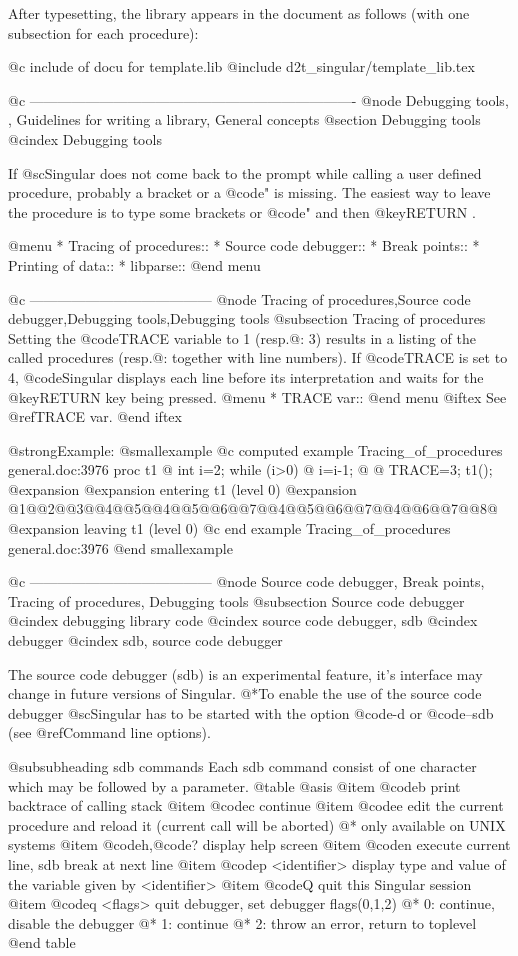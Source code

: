{{{After typesetting, the library appears in the document as follows (with
one subsection for each procedure):

@c include of docu for template.lib
@include d2t_singular/template_lib.tex

@c ----------------------------------------------------------------------
@node Debugging tools,  , Guidelines for writing a library, General concepts
@section Debugging tools
@cindex Debugging tools

If @sc{Singular} does not come back to the prompt while calling a user
defined procedure, probably a bracket or a @code{"} is missing.  The
easiest way to leave the procedure is to type some brackets or @code{"}
and then @key{RETURN} .

@menu
* Tracing of procedures::
* Source code debugger::
* Break points::
* Printing of data::
* libparse::
@end menu

@c ---------------------------------------
@node Tracing of procedures,Source code debugger,Debugging tools,Debugging tools
@subsection Tracing of procedures
Setting the @code{TRACE} variable to 1 (resp.@: 3) results in a listing of
the called procedures (resp.@: together with line numbers).
If @code{TRACE} is set to 4, @code{Singular}
displays each line before its interpretation and waits for the @key{RETURN}
key being pressed.
@menu
* TRACE var::
@end menu
@iftex
See @ref{TRACE var}.
@end iftex

@strong{Example:}
@smallexample
@c computed example Tracing_of_procedures general.doc:3976 
  proc t1
  @{
    int i=2;
    while (i>0)
    @{ i=i-1; @}
  @}
  TRACE=3;
  t1();
@expansion{} 
@expansion{} entering t1 (level 0)
@expansion{} @{1@}@{2@}@{3@}@{4@}@{5@}@{4@}@{5@}@{6@}@{7@}@{4@}@{5@}@{6@}@{7@}@{4@}@{6@}@{7@}@{8@}
@expansion{} leaving  t1 (level 0)
@c end example Tracing_of_procedures general.doc:3976
@end smallexample

@c ---------------------------------------
@node Source code debugger, Break points, Tracing of procedures, Debugging tools
@subsection Source code debugger
@cindex debugging library code
@cindex source code debugger, sdb
@cindex debugger
@cindex sdb, source code debugger


The source code debugger (sdb) is an experimental feature, it's
interface may change in future versions of Singular.  @*To enable the
use of the source code debugger @sc{Singular} has to be started with the
option @code{-d} or @code{--sdb} (see @ref{Command line options}).


@subsubheading sdb commands
Each sdb command consist of one character which may be followed by
a parameter.
@table @asis
@item @code{b}
print backtrace of calling stack
@item @code{c}
continue
@item @code{e}
edit the current procedure and reload it (current call will be aborted)
@* only available on UNIX systems
@item @code{h},@code{?}
display help screen
@item @code{n}
execute current line, sdb break at next line
@item @code{p} <identifier>
display type and value of the variable given by <identifier>
@item @code{Q}
quit this Singular session
@item @code{q} <flags>
quit debugger, set debugger flags(0,1,2)
@* 0: continue, disable the debugger
@* 1: continue
@* 2: throw an error, return to toplevel
@end table


}}}
